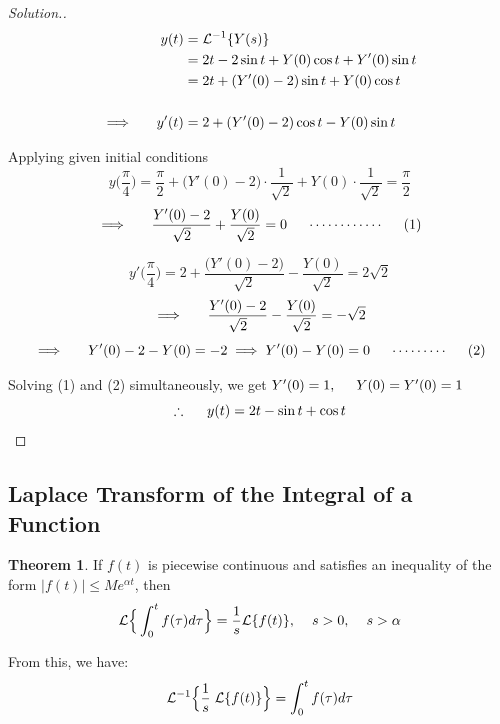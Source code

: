 \documentclass[11pt,a4paper]{article}
\theoremstyle{definition}
\newtheorem{thm}{Theorem}[subsection]
\newenvironment{solution}
  {\renewcommand{\qedsymbol}{}\begin{proof}[\textit{Solution}.]}
  {\end{proof}}
\begin{document}
\begin{solution}
\begin{align*}
y(t) & = \mathcal{L}^{-1}\{Y(s)\}\\
&  = 2t  - 2\sin t + Y(0) \cos t + Y'(0)\sin t\\
& = 2t + (Y'(0) - 2)\sin t + Y(0) \cos t\\\\
\implies\hspace{0.5cm} y'(t) & = 2 + (Y'(0) - 2)\cos t - Y(0)\sin t
\end{align*}

Applying given initial conditions
$$y\bigg(\dfrac{\pi}{4}\bigg) = \frac{\pi}{2} + \big(Y'(0) -2\big)\cdot \frac{1}{\sqrt{2}} + Y(0)\cdot \frac{1}{\sqrt{2}} = \frac{\pi}{2}$$
$$\implies \hspace{0.5cm} \frac{Y'(0) -2}{\sqrt{2}}+ \frac{Y(0)}{\sqrt{2}} = 0\hspace{0.5cm}\cdots\cdots\cdots\cdots\hspace{0.5cm} (1)$$

$$y'\bigg(\dfrac{\pi}{4}\bigg) = 2 + \frac{\big(Y'(0) -2\big)}{\sqrt{2}} - \frac{Y(0)}{\sqrt{2}} = 2\sqrt{2}$$
$$\implies \hspace{0.5cm} \frac{Y'(0) - 2}{\sqrt{2}} - \frac{Y(0)}{\sqrt{2}} = -\sqrt{2}$$
$$\implies \hspace{0.5cm} Y'(0) -2 - Y(0) = -2\implies Y'(0) - Y(0) = 0\hspace{0.5cm}\cdots\cdots\cdots\hspace{0.5cm} (2)$$

Solving (1) and (2) simultaneously, we get $Y'(0) = 1,\hspace{0.5cm} Y(0) = Y'(0) = 1$
$$\therefore\hspace{0.5cm} y(t) = 2t - \sin t + \cos t$$
\end{solution}

{\color[wave]{485}\subsection{Laplace Transform of the Integral of a Function}}

\begin{thm}


If $f(t)$ is piecewise continuous and satisfies an inequality of the form $\big|f(t)\big|\leq Me^{\alpha t}$, then $$\mathcal{L}\Big\{\int^t_0f(\tau) d\tau\Big\} = \frac{1}{s} \mathcal{L}\{f(t)\},\hspace{0.4cm} s>0,\hspace{0.4cm} s>\alpha$$

From this, we have: $$\mathcal{L}^{-1}\Big\{\frac{1}{s}\hspace{0.1cm} \mathcal{L}\{f(t)\}\Big\} = \int^t_0f(\tau) d\tau$$
\end{thm}
\end{document}
